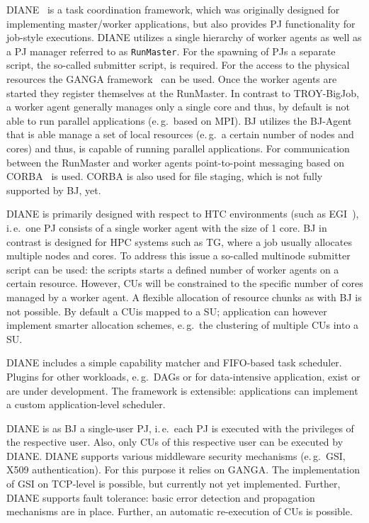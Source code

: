 \documentclass[conference,final]{IEEEtran}
\newcommand{\cu}{CU}
\begin{document}
DIANE~\cite{Moscicki:908910} is a task coordination framework, which
was originally designed for implementing master/worker applications,
but also provides PJ functionality for job-style executions. DIANE
utilizes a single hierarchy of worker agents as well as a PJ manager
referred to as \texttt{RunMaster}.
For the spawning of PJs a separate script, the so-called submitter script, is
required. For the access to the physical resources the GANGA
framework~\cite{Moscicki20092303} can be used.
Once the worker agents are started they register themselves at the RunMaster.
In contrast to TROY-BigJob, a worker agent generally manages only a single
core and thus, by default is not able to run parallel applications (e.\,g.\
based on MPI). BJ utilizes the BJ-Agent that is able manage a set of local
resources (e.\,g.\ a certain number of nodes and cores) and thus, is capable
of running parallel applications. For communication between the RunMaster and
worker agents point-to-point messaging based on CORBA~\cite{OMG-CORBA303:2004}
is used. CORBA is also used for file staging, which is not fully supported by
BJ, yet.

DIANE is primarily designed with respect to HTC environments (such as
EGI~\cite{egi}), i.\,e.\ one PJ consists of a single worker agent with the
size of 1 core. BJ in contrast is designed for HPC systems such as TG,
where a job usually allocates multiple nodes and cores. To address this issue
a so-called multinode submitter script can be used: the scripts starts a
defined number of worker agents on a certain resource. However, \cu s will be
constrained to the specific number of cores managed by a worker agent. A
flexible allocation of resource chunks as with BJ is not possible. By
default a \cu  is mapped to a SU; application can however implement smarter
allocation schemes, e.\,g.\ the clustering of multiple \cu s into a SU.

DIANE includes a simple capability matcher and FIFO-based task scheduler.
Plugins for other workloads, e.\,g.\ DAGs or for data-intensive
application, exist or are under development. The framework is extensible:
applications can implement a custom application-level scheduler.


DIANE is as BJ a single-user PJ, i.\,e.\ each PJ is executed with the
privileges of the respective user. Also, only \cu s of this respective user can be
executed by DIANE. DIANE supports various middleware security mechanisms
(e.\,g.\ GSI, X509 authentication). For this purpose it relies on GANGA. The
implementation of GSI on TCP-level is possible, but currently not yet
implemented. Further, DIANE supports fault tolerance: basic error detection and
propagation mechanisms are in place. Further, an automatic re-execution of \cu s
is possible.
\end{document}
